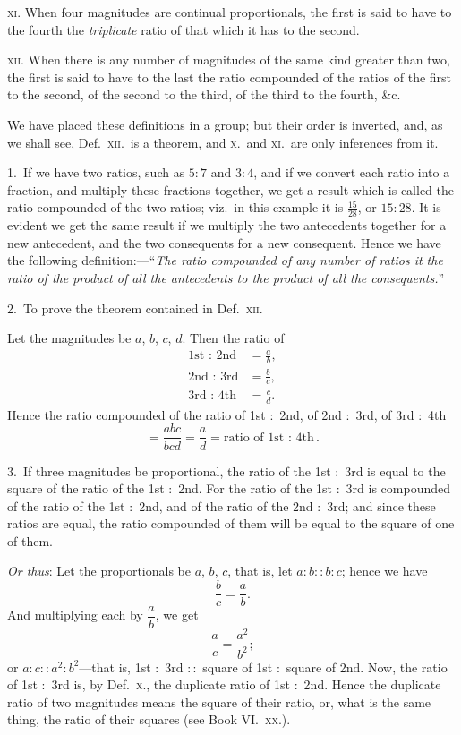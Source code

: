 \documentclass[oneside]{book}
\begin{document}
\textsc{xi}. When four magnitudes are continual proportionals,
the first is said to have to the fourth the
\emph{triplicate} ratio of that which it has to the second.

\textsc{xii}. When there is any number of magnitudes of the
same kind greater than two, the first is said to have to
the last the ratio compounded of the ratios of the first
to the second, of the second to the third, of the third
to the fourth, \&c.

\smallskip
\begin{footnotesize}
We have placed these definitions in a group; but their order
is inverted, and, as we shall see, Def.~\textsc{xii}.\ is a theorem, and \textsc{x}.\
and \textsc{xi}.\ are only inferences from it.

1.~If we have two ratios, such as $5 : 7$ and $3 : 4$, and if we
convert each ratio into a fraction, and multiply these fractions
together, we get a result which is called the ratio compounded of
the two ratios; viz.~in this example it is $\frac{15}{28}$, or $15 : 28$. It is
evident we get the same result if we multiply the two antecedents
together for a new antecedent, and the two consequents for a
new consequent. Hence we have the following definition:---``\emph{The
ratio compounded\index{Ratio!compound} of any number of ratios it the ratio of
the product of all the antecedents to the product of all the consequents.}''

2.~To prove the theorem contained in Def.~\textsc{xii}.

Let the magnitudes be $a$, $b$, $c$, $d$. Then the ratio of
\begin{align*}
\text{1st $:$ 2nd} & = \frac{a}{b}, \\
\text{2nd $:$ 3rd} & = \frac{b}{c}, \\
\text{3rd $:$ 4th} & = \frac{c}{d}.
\end{align*}
Hence the ratio compounded of the ratio of 1st $:$ 2nd, of 2nd $:$ 3rd,
of 3rd $:$ 4th
\[
= \frac{abc}{bcd} = \frac{a}{d} = \text{ratio of 1st $:$ 4th}.
\]

3.~If three magnitudes be proportional, the ratio of the 1st $:$ 3rd
is equal to the square of the ratio of the 1st $:$ 2nd. For the ratio
of the 1st $:$ 3rd is compounded of the ratio of the 1st $:$ 2nd, and
of the ratio of the 2nd $:$ 3rd; and since these ratios are equal,
the ratio compounded of them will be equal to the square of one
of them.

\emph{Or thus}: Let the proportionals be $a$, $b$, $c$, that is, let $a : b :: b : c$;
hence we have
\[
\frac{b}{c} = \frac{a}{b}.
\]
And multiplying each by $\dfrac{a}{b}$, we get
\[
\frac{a}{c} = \frac{a^2}{b^2};
\]
or $a : c :: a^2 : b^2$---that is, 1st $:$ 3rd $::$ square of 1st $:$ square of 2nd.
Now, the ratio of 1st $:$ 3rd is, by Def.~\textsc{x}., the duplicate ratio of
1st $:$ 2nd. Hence the duplicate ratio\index{Ratio!duplicate} of two magnitudes means
the square of their ratio, or, what is the same thing, the ratio of
their squares (see Book VI\@.\ \textsc{xx}.).


\end{footnotesize}
\end{document}
